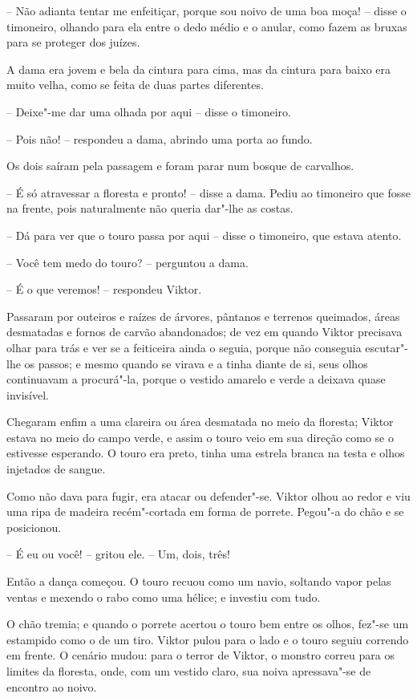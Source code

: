 -- Não adianta tentar me enfeitiçar, porque sou noivo de uma boa moça! --
disse o timoneiro, olhando para ela entre o dedo médio e o anular, como
fazem as bruxas para se proteger dos juízes.

A dama era jovem e bela da cintura para cima, mas da cintura para baixo
era muito velha, como se feita de duas partes diferentes.

-- Deixe"-me dar uma olhada por aqui -- disse o timoneiro.

-- Pois não! -- respondeu a dama, abrindo uma porta ao fundo.

Os dois saíram pela passagem e foram parar num bosque de carvalhos.

-- É só atravessar a floresta e pronto! -- disse a dama. Pediu ao
timoneiro que fosse na frente, pois naturalmente não queria dar"-lhe
as costas.  

-- Dá para ver que o touro passa por aqui -- disse o timoneiro, que estava
atento.

-- Você tem medo do touro? -- perguntou a dama.

-- É o que veremos! -- respondeu Viktor.  

Passaram por outeiros e raízes de árvores, pântanos e terrenos
queimados, áreas desmatadas e fornos de carvão abandonados; de vez em
quando Viktor precisava olhar para trás e ver se a feiticeira ainda o
seguia, porque não conseguia escutar"-lhe os passos; e mesmo quando se
virava e a tinha diante de si, seus olhos continuavam a procurá"-la,
porque o vestido amarelo e verde a deixava quase invisível.

Chegaram enfim a uma clareira ou área desmatada no meio da floresta;
Viktor estava no meio do campo verde, e assim o touro veio em sua
direção como se o estivesse esperando. O touro era preto, tinha uma
estrela branca na testa e olhos injetados de sangue. 

Como não dava para fugir, era atacar ou defender"-se. Viktor olhou ao
redor e viu uma ripa de madeira recém"-cortada em forma de porrete.
Pegou"-a do chão e se posicionou.

-- É eu ou você! -- gritou ele. -- Um, dois, três!

Então a dança começou. O touro recuou como um navio, soltando vapor
pelas ventas e mexendo o rabo como uma hélice; e investiu com tudo. 

O chão tremia; e quando o porrete acertou o touro bem entre os olhos,
fez"-se um estampido como o de um tiro. Viktor pulou para o lado e o
touro seguiu correndo em frente. O cenário mudou: para o terror de
Viktor, o monstro correu para os limites da floresta, onde, com um
vestido claro, sua noiva apressava"-se de encontro ao noivo. 

